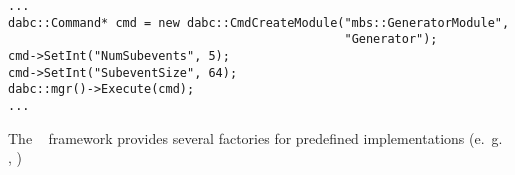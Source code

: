 \begin{small}
\begin{verbatim}
...
dabc::Command* cmd = new dabc::CmdCreateModule("mbs::GeneratorModule", 
                                               "Generator");
cmd->SetInt("NumSubevents", 5);
cmd->SetInt("SubeventSize", 64);
dabc::mgr()->Execute(cmd);
...
\end{verbatim}     
\end{small}

The \dabc~ framework provides several factories for predefined 
implementations (e.~g.~ , )






